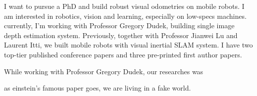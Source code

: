 \documentclass[12pt]{article}
\begin{document}
I want to pursue a PhD and build robust visual odometries on mobile robots. I am interested in robotics, vision and learning, especially on low-specs machines. currently, I'm working with Professor Gregory Dudek, building single image depth estimation system. Previously, together with Professor Jianwei Lu and Laurent Itti, we built mobile robots with visual inertial SLAM system. I have two top-tier published conference papers and three pre-printed first author papers.

While working with Professor Gregory Dudek, our researches was 

as \cite{einstein1935can} einstein's famous paper goes, we are living in a fake world.


\medskip



\end{document}
